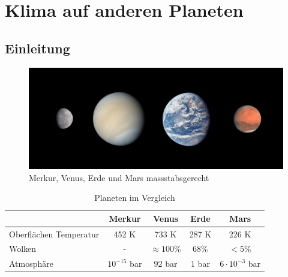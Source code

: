 %
%
%

\chapter{Klima auf anderen Planeten\label{chapter:thema}}
\begin{refsection}

\section{Einleitung}

\begin{figure}
	\centering
	\includegraphics[width=0.7\linewidth, trim={0 2cm 0 2cm},clip]{planeten/Pictures/planets2.jpg}
	\caption{Merkur, Venus, Erde und Mars massstabsgerecht}
\end{figure}

\begin{center}
\begin{table}
	\center
	\begin{tabular}{l|c c c c}
                           & Merkur         & Venus           & Erde    & Mars                  \\
  \hline
  Oberflächen Temperatur   & 452 K          & 733 K           & 287 K   & 226 K                 \\
  Wolken                   & -              & $\approx100\%$  & $68\%$  & $<5\%$                \\
  Atmosphäre               & $10^{-15}$ bar & $92$ bar        & $1$ bar & $6 \cdot 10^{-3}$ bar 
\end{tabular}
\caption{Planeten im Vergleich}
\end{table}
\end{center}


\end{refsection}
